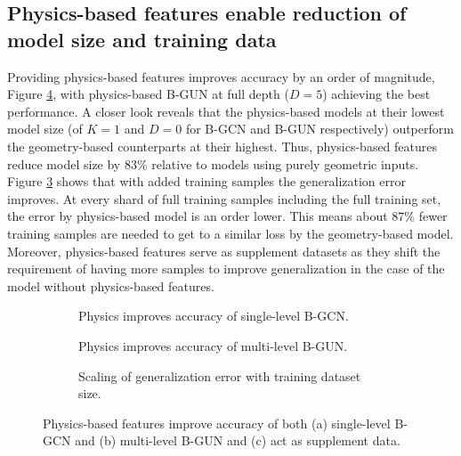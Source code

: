 \documentclass{marine_2025_paper_template}
\begin{document}
\subsection{Physics-based features enable reduction of model size and training data}

\noindent Providing physics-based features improves accuracy by an order of magnitude, Figure \ref{fig:pbf_improves_accuracy}, with physics-based B-GUN at full depth ($D=5$) achieving the best performance. A closer look reveals that the physics-based models at their lowest model size (of $K=1$ and $D=0$ for B-GCN and B-GUN respectively) outperform the geometry-based counterparts at their highest. Thus, physics-based features reduce model size by $83\%$ relative to models using purely geometric inputs. Figure \ref{fig:scaling_generalization} shows that with added training samples the generalization error improves. At every shard of full training samples including the full training set, the error by physics-based model is an order lower. This means about $87\%$ fewer training samples are needed to get to a similar loss by the geometry-based model. Moreover, physics-based features serve as supplement datasets as they shift the requirement of having more samples to improve generalization in the case of the model without physics-based features.

\begin{figure}[t]
    \begin{subfigure}{.3\textwidth}
        \centering
        
        \vspace{-0.5cm}
        \caption{Physics improves accuracy of single-level B-GCN.}
        \label{fig:pbf_bgnn_test_loss}
    \end{subfigure}
    \hfill
    \begin{subfigure}{.3\textwidth}
        \centering
        
        \vspace{-0.5cm}
        \caption{Physics improves accuracy of multi-level B-GUN.}
        \label{fig:pbf_bgun_test_loss}
    \end{subfigure}
    \hfill
    \begin{subfigure}{0.37\textwidth}
        \centering
        \raisebox{0.1cm}{}
        \vspace{-0.5cm}
        \caption{Scaling of generalization error with training dataset size.}
        \label{fig:scaling_generalization}
    \end{subfigure}
    \vspace{-0.2cm}
    \caption{Physics-based features improve accuracy of both (a) single-level B-GCN and (b) multi-level B-GUN and (c) act as supplement data.}
    \label{fig:pbf_improves_accuracy}
\end{figure}
\end{document}
